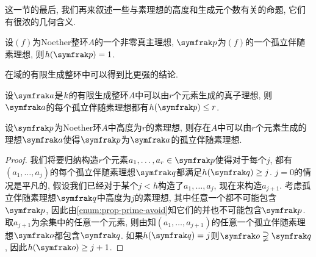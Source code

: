 这一节的最后, 我们再来叙述一些与素理想的高度和生成元个数有关的命题, 它们有很浓的几何含义.

\begin{theoremnoproof}\label{thm:krullhauptidealsatz}
  设$(f)$为Noether整环$A$的一个非零真主理想, $\ideal{p}$为$(f)$的一个孤立伴随素理想, 则$h(\ideal{p})=1$.
\end{theoremnoproof}

在域的有限生成整环中可以得到比更强的结论.

\begin{propositionnoproof}\label{prop:isolatedprimegenerator2height}
  设$\ideal{a}$是$k$的有限生成整环$A$中可以由$r$个元素生成的真子理想, 则$\ideal{a}$的每个孤立伴随素理想都有$h(\ideal{p})\leq r$.
\end{propositionnoproof}


\begin{proposition}\label{prop:isolatedprimeheight2generator}
  设$\ideal{p}$为Noether环$A$中高度为$r$的素理想, 则存在$A$中可以由$r$个元素生成的理想$\ideal{a}$使得$\ideal{p}$为$\ideal{a}$的孤立伴随素理想.
\end{proposition}

\begin{proof}
  我们将要归纳构造$r$个元素$a_1, \dotsc, a_r\in\ideal{p}$使得对于每个$j$, 都有$(a_1, \dotsc, a_j)$的每个孤立伴随素理想$\ideal{q}$都满足$h(\ideal{q})\geq j$. $j=0$的情况是平凡的, 假设我们已经对于某个$j<h$构造了$a_1, \dotsc, a_{j}$, 现在来构造$a_{j+1}$. 考虑孤立伴随素理想$\ideal{q}$中高度为$j$的素理想, 其中任意一个都不可能包含$\ideal{p}$, 因此由\ref{enum:prop-prime-avoid}知它们的并也不可能包含$\ideal{p}$. 取$a_{j+1}$为余集中的任意一个元素, 则由知$(a_1, \dotsc, a_{j+1})$的任意一个孤立伴随素理想$\ideal{o}$都包含$\ideal{q}$. 如果$h(\ideal{q})=j$则$\ideal{o}\supsetneqq \ideal{q}$, 因此$h(\ideal{o})\geq j+1$.
\end{proof}




